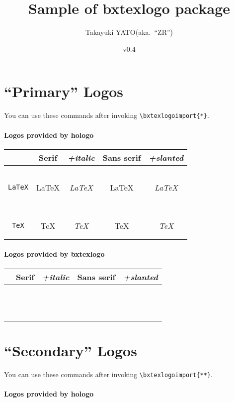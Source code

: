 \documentclass[a4paper]{article}
\newcommand{\PkgVersion}{0.4}
\newcommand{\PkgDate}{2018/03/31}
\newcommand{\Pkg}[1]{\textsf{#1}}
\newenvironment{LogoSamples}{%
  \begin{center}\begin{tabular}{ccccc}
    \hline \phantom{\LARGE I}
        & \textrm{Serif} & \textit{+italic}
        & \textsf{Sans serif} & \textsl{+slanted}
    \\\hline
}{%
    \hline
  \end{tabular}\end{center}
}
\newcommand*{\LSEntry}[1]{%
  \texttt{\string#1} & \textrm{#1} & \textit{#1}
      & \textsf{#1} & \textsf{\textsl{#1}}
  \\}
\begin{document}
\title{Sample of \Pkg{bxtexlogo} package}
\author{Takayuki YATO\quad (aka.~``ZR'')}
\date{v\PkgVersion \quad[\PkgDate]}
\maketitle

\section{``Primary'' Logos}

You can use these commands after invoking
\verb|\bxtexlogoimport{*}|.

\paragraph{Logos provided by \Pkg{hologo}}\mbox{}

\begin{LogoSamples}
\LSEntry{\AmSLaTeX}
\LSEntry{\AmSTeX}
\LSEntry{\BibTeX}
\LSEntry{\ConTeXt}
\LSEntry{\eTeX}
\LSEntry{\LaTeX}
\LSEntry{\LaTeXe}
\LSEntry{\LuaLaTeX}
\LSEntry{\LuaTeX}
\LSEntry{\LyX}
\LSEntry{\METAFONT}
\LSEntry{\METAPOST}
\LSEntry{\pdfTeX}
\LSEntry{\pdfLaTeX}
\LSEntry{\TeX}
\LSEntry{\XeLaTeX}
\LSEntry{\XeTeX}
\end{LogoSamples}

\paragraph{Logos provided by \Pkg{bxtexlogo}}\mbox{}

\begin{LogoSamples}
\LSEntry{\epTeX}
\LSEntry{\eupTeX}
\LSEntry{\JBibTeX}
\LSEntry{\pBibTeX}
\LSEntry{\pLaTeXe}
\LSEntry{\pLaTeX}
\LSEntry{\pTeX}
\LSEntry{\TikZ}
\LSEntry{\upBibTeX}
\LSEntry{\upLaTeX}
\LSEntry{\upLaTeXe}
\LSEntry{\upTeX}
\end{LogoSamples}

\newpage
\section{``Secondary'' Logos}

You can use these commands after invoking
\verb|\bxtexlogoimport{**}|.

\paragraph{Logos provided by \Pkg{hologo}}\mbox{}
\end{document}

